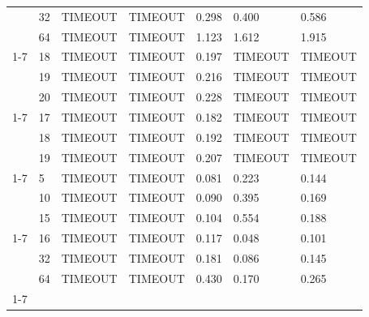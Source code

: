 \begin{tabular}{lllllll}
 & 32 & TIMEOUT & TIMEOUT & 0.298 & 0.400 & 0.586 \\
 & 64 & TIMEOUT & TIMEOUT & 1.123 & 1.612 & 1.915 \\
\cline{1-7}
\multirow[t]{3}{*}{qnn} & 18 & TIMEOUT & TIMEOUT & 0.197 & TIMEOUT & TIMEOUT \\
 & 19 & TIMEOUT & TIMEOUT & 0.216 & TIMEOUT & TIMEOUT \\
 & 20 & TIMEOUT & TIMEOUT & 0.228 & TIMEOUT & TIMEOUT \\
\cline{1-7}
\multirow[t]{3}{*}{su2random} & 17 & TIMEOUT & TIMEOUT & 0.182 & TIMEOUT & TIMEOUT \\
 & 18 & TIMEOUT & TIMEOUT & 0.192 & TIMEOUT & TIMEOUT \\
 & 19 & TIMEOUT & TIMEOUT & 0.207 & TIMEOUT & TIMEOUT \\
\cline{1-7}
\multirow[t]{3}{*}{vqe} & 5 & TIMEOUT & TIMEOUT & 0.081 & 0.223 & 0.144 \\
 & 10 & TIMEOUT & TIMEOUT & 0.090 & 0.395 & 0.169 \\
 & 15 & TIMEOUT & TIMEOUT & 0.104 & 0.554 & 0.188 \\
\cline{1-7}
\multirow[t]{3}{*}{wstate} & 16 & TIMEOUT & TIMEOUT & 0.117 & 0.048 & 0.101 \\
 & 32 & TIMEOUT & TIMEOUT & 0.181 & 0.086 & 0.145 \\
 & 64 & TIMEOUT & TIMEOUT & 0.430 & 0.170 & 0.265 \\
\cline{1-7}
\bottomrule
\end{tabular}
